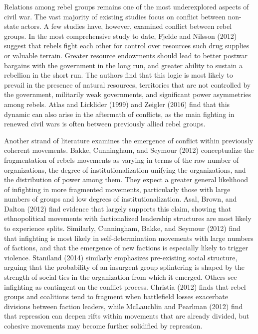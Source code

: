 \documentclass[12pt,]{article}
\begin{document}
Relations among rebel groups remains one of the most underexplored
aspects of civil war. The vast majority of existing studies focus on
conflict between non-state actors. A few studies have, however, examined
conflict between rebel groups. In the most comprehensive study to date,
Fjelde and Nilsson (2012) suggest that rebels fight each other for
control over resources such drug supplies or valuable terrain. Greater
resource endowments should lead to better postwar bargains with the
government in the long run, and greater ability to sustain a rebellion
in the short run. The authors find that this logic is most likely to
prevail in the presence of natural resources, territories that are not
controlled by the government, militarily weak governments, and
significant power asymmetries among rebels. Atlas and Licklider (1999)
and Zeigler (2016) find that this dynamic can also arise in the
aftermath of conflicts, as the main fighting in renewed civil wars is
often between previously allied rebel groups.

Another strand of literature examines the emergence of conflict within
previously coherent movements. Bakke, Cunningham, and Seymour (2012)
conceptualize the fragmentation of rebels movements as varying in terms
of the raw number of organizations, the degree of institutionalization
unifying the organizations, and the distribution of power among them.
They expect a greater general likelihood of infighting in more
fragmented movements, particularly those with large numbers of groups
and low degrees of institutionalization. Asal, Brown, and Dalton (2012)
find evidence that largely supports this claim, showing that
ethnopolitical movements with factionalized leadership structures are
most likely to experience splits. Similarly, Cunningham, Bakke, and
Seymour (2012) find that infighting is most likely in self-determination
movements with large numbers of factions, and that the emergence of new
factions is especially likely to trigger violence. Staniland (2014)
similarly emphasizes pre-existing social structure, arguing that the
probability of an insurgent group splintering is shaped by the strength
of social ties in the organization from which it emerged. Others see
infighting as contingent on the conflict process. Christia (2012) finds
that rebel groups and coalitions tend to fragment when battlefield
losses exacerbate divisions between faction leaders, while McLauchlin
and Pearlman (2012) find that repression can deepen rifts within
movements that are already divided, but cohesive movements may become
further solidified by repression.
\end{document}

